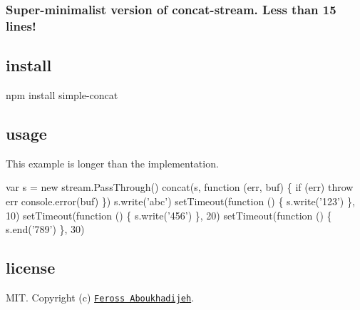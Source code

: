 \subsubsection*{Super-\/minimalist version of {\ttfamily concat-\/stream}. Less than 15 lines!}

\subsection*{install}


\begin{DoxyCode}
npm install simple-concat
\end{DoxyCode}


\subsection*{usage}

This example is longer than the implementation.


\begin{DoxyCode}
var s = new stream.PassThrough()
concat(s, function (err, buf) \{
  if (err) throw err
  console.error(buf)
\})
s.write('abc')
setTimeout(function () \{
  s.write('123')
\}, 10)
setTimeout(function () \{
  s.write('456')
\}, 20)
setTimeout(function () \{
  s.end('789')
\}, 30)
\end{DoxyCode}


\subsection*{license}

M\+IT. Copyright (c) \href{http://feross.org}{\tt Feross Aboukhadijeh}. 